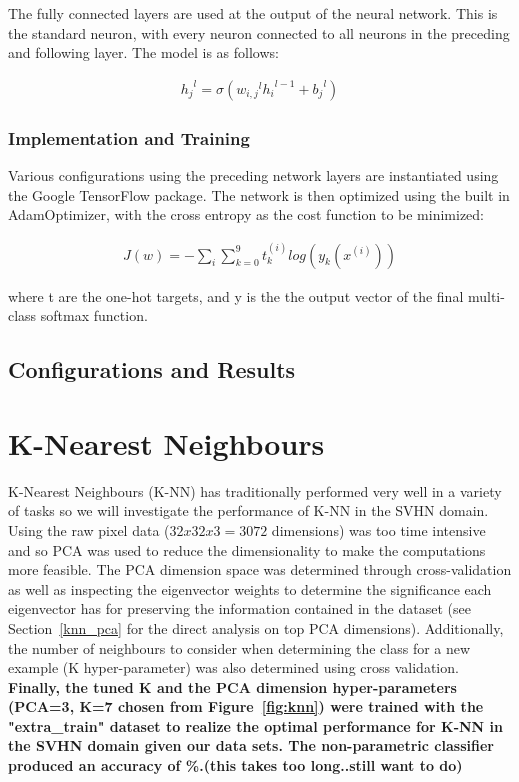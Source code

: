\documentclass{article} %
\begin{document}
The fully connected layers are used at the output of the neural network. This is the standard neuron, with every neuron connected to all neurons in the preceding and following layer. The model is as follows:

\begin{gather}
{h_{j}}^l = \sigma({w_{i,j}}^{l} {h_{i}}^{l-1} + {b_j}^l) 
\end{gather}

\subsubsection{Implementation and Training}

Various configurations using the preceding network layers are instantiated using the Google TensorFlow package. The network is then optimized using the built in AdamOptimizer, with the cross entropy as the cost function to be minimized:

\begin{gather}
J(w) = - \sum_{i}{\sum_{k=0}^{9}{t^{(i)}_k}log(y_k(x^{(i)}))}
\end{gather}

where t are the one-hot targets, and y is the the output vector of the final multi-class softmax function. 

\subsection{Configurations and Results}



\section{K-Nearest Neighbours}
K-Nearest Neighbours (K-NN) has traditionally performed very well in a variety of tasks so we will investigate the performance of K-NN in the SVHN domain. Using the raw pixel data ($32 x 32 x 3 = 3072$ dimensions) was too time intensive and so PCA was used to reduce the dimensionality to make the computations more feasible.  The PCA dimension space was determined through cross-validation as well as inspecting the eigenvector weights to determine the significance each eigenvector has for preserving the information contained in the dataset (see Section~\ref{knn_pca} for the direct analysis on top PCA dimensions).  Additionally, the number of neighbours to consider when determining the class for a new example (K hyper-parameter) was also determined using cross validation. \textbf{Finally, the tuned K and the PCA dimension hyper-parameters (PCA=3, K=7 chosen from Figure~\ref{fig:knn}) were trained with the "extra\_train" dataset to realize the optimal performance for K-NN in the SVHN domain given our data sets. The non-parametric classifier produced an accuracy of \%.(this takes too long..still want to do)}
\end{document}
